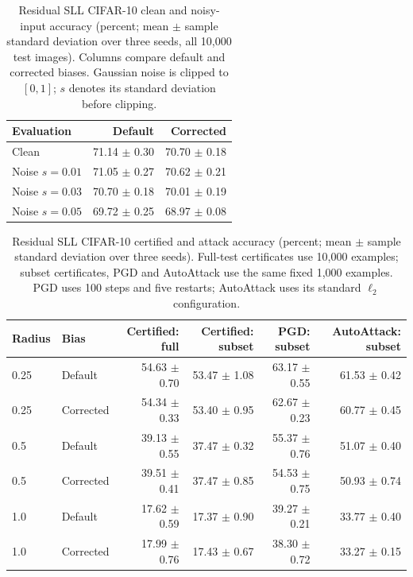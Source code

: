 \begin{table}[pos=htbp]
\centering
\small
\setlength{\tabcolsep}{3pt}
\caption{Residual SLL CIFAR-10 clean and noisy-input accuracy (percent; mean $\pm$ sample standard deviation over three seeds, all 10,000 test images). Columns compare default and corrected biases. Gaussian noise is clipped to $[0,1]$; $s$ denotes its standard deviation before clipping.}
\begin{tabular}{lrr}
Evaluation & Default & Corrected \\
\hline
Clean & 71.14 $\pm$ 0.30 & 70.70 $\pm$ 0.18 \\
Noise $s=0.01$ & 71.05 $\pm$ 0.27 & 70.62 $\pm$ 0.21 \\
Noise $s=0.03$ & 70.70 $\pm$ 0.18 & 70.01 $\pm$ 0.19 \\
Noise $s=0.05$ & 69.72 $\pm$ 0.25 & 68.97 $\pm$ 0.08 \\
\end{tabular}
\label{tab:residual-noise}
\end{table}

\begin{table}[pos=htbp]
\centering
\small
\caption{Residual SLL CIFAR-10 certified and attack accuracy (percent; mean $\pm$ sample standard deviation over three seeds). Full-test certificates use 10,000 examples; subset certificates, PGD and AutoAttack use the same fixed 1,000 examples. PGD uses 100 steps and five restarts; AutoAttack uses its standard $\ell_2$ configuration.}
\begin{tabular}{llrrrr}
Radius & Bias & Certified: full & Certified: subset & PGD: subset & AutoAttack: subset \\
\hline
0.25 & Default & 54.63 $\pm$ 0.70 & 53.47 $\pm$ 1.08 & 63.17 $\pm$ 0.55 & 61.53 $\pm$ 0.42 \\
0.25 & Corrected & 54.34 $\pm$ 0.33 & 53.40 $\pm$ 0.95 & 62.67 $\pm$ 0.23 & 60.77 $\pm$ 0.45 \\
0.5 & Default & 39.13 $\pm$ 0.55 & 37.47 $\pm$ 0.32 & 55.37 $\pm$ 0.76 & 51.07 $\pm$ 0.40 \\
0.5 & Corrected & 39.51 $\pm$ 0.41 & 37.47 $\pm$ 0.85 & 54.53 $\pm$ 0.75 & 50.93 $\pm$ 0.74 \\
1.0 & Default & 17.62 $\pm$ 0.59 & 17.37 $\pm$ 0.90 & 39.27 $\pm$ 0.21 & 33.77 $\pm$ 0.40 \\
1.0 & Corrected & 17.99 $\pm$ 0.76 & 17.43 $\pm$ 0.67 & 38.30 $\pm$ 0.72 & 33.27 $\pm$ 0.15 \\
\end{tabular}
\label{tab:residual-robustness}
\end{table}

